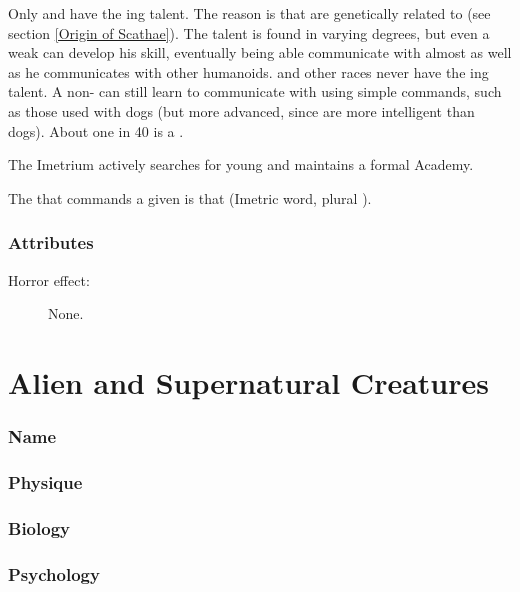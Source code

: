 
Only \scathae{} and \rachyth{} have the \nycaneer ing talent. The reason is that \scathae{} are genetically related to \nycans{} (see section \ref{Origin of Scathae}). The talent is found in varying degrees, but even a weak \nycaneer{} can develop his skill, eventually being able communicate with \nycans{} almost as well as he communicates with other humanoids. \Humans{} and other races never have the \nycaneer ing talent. A non-\nycaneer{} can still learn to communicate with \nycans{} using simple commands, such as those used with dogs (but more advanced, since \nycans{} are more intelligent than dogs). About one in 40 \scathae{} is a \nycaneer{}. 

The Imetrium actively searches for young \nycaneers{} and maintains a formal \Nycaneer{} Academy. 

The \nycaneer{} that commands a given \nycan{} is that \nycanz{}  (Imetric word, plural ). 

\subsubsection{Attributes}
\begin{description}
	\item[Horror effect:] None. 
\end{description}





\newpage
\section{Alien and Supernatural Creatures}

\subsubsection{Name}
\subsubsection{Physique}
\subsubsection{Biology}
\subsubsection{Psychology}
